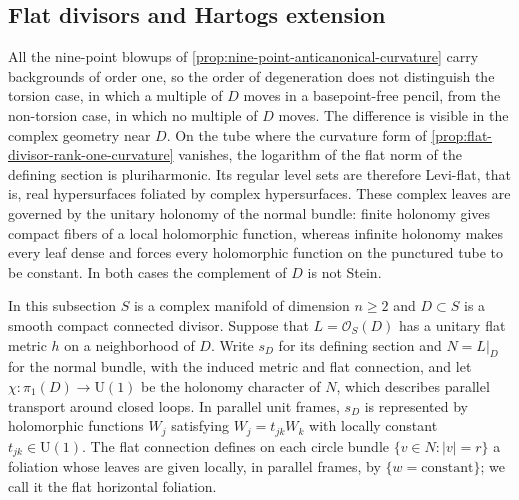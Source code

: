 \subsection{Flat divisors and Hartogs extension}
\label{subsec:flat-divisor-complements}

All the nine-point blowups of \cref{prop:nine-point-anticanonical-curvature} carry backgrounds of order one, so the order of degeneration does not distinguish the torsion case, in which a multiple of $D$ moves in a basepoint-free pencil, from the non-torsion case, in which no multiple of $D$ moves. The difference is visible in the complex geometry near $D$. On the tube where the curvature form of \cref{prop:flat-divisor-rank-one-curvature} vanishes, the logarithm of the flat norm of the defining section is pluriharmonic. Its regular level sets are therefore Levi-flat, that is, real hypersurfaces foliated by complex hypersurfaces. These complex leaves are governed by the unitary holonomy of the normal bundle: finite holonomy gives compact fibers of a local holomorphic function, whereas infinite holonomy makes every leaf dense and forces every holomorphic function on the punctured tube to be constant. In both cases the complement of $D$ is not Stein.

In this subsection $S$ is a complex manifold of dimension $n\geq2$ and $D\subset S$ is a smooth compact connected divisor. Suppose that $L=\mathcal O_S(D)$ has a unitary flat metric $h$ on a neighborhood of $D$. Write $s_D$ for its defining section and $N=L|_D$ for the normal bundle, with the induced metric and flat connection, and let $\chi\colon\pi_1(D)\to\mathrm U(1)$ be the holonomy character of $N$, which describes parallel transport around closed loops. In parallel unit frames, $s_D$ is represented by holomorphic functions $W_j$ satisfying $W_j=t_{jk}W_k$ with locally constant $t_{jk}\in\mathrm U(1)$. The flat connection defines on each circle bundle $\{v\in N:|v|=r\}$ a foliation whose leaves are given locally, in parallel frames, by $\{w=\text{constant}\}$; we call it the flat horizontal foliation.

